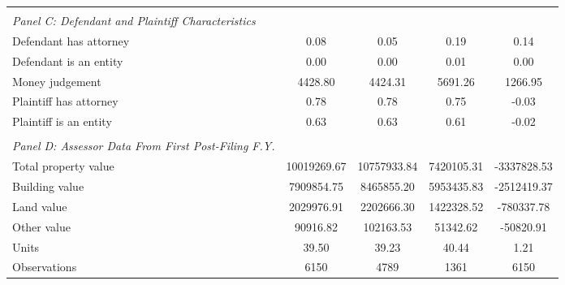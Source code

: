\begin{table}[htbp]
\begin{tabular}{l*{4}{c}}
\vspace{0.1em} \\ \emph{Panel C: Defendant and Plaintiff Characteristics}&            &            &            &            \\
\hspace{0.25cm}Defendant has attorney&       0.08 &       0.05 &       0.19 &        0.14\\
\hspace{0.25cm}Defendant is an entity&       0.00 &       0.00 &       0.01 &        0.00\\
\hspace{0.25cm}Money judgement&    4428.80 &    4424.31 &    5691.26 &     1266.95\\
\hspace{0.25cm}Plaintiff has attorney&       0.78 &       0.78 &       0.75 &       -0.03\\
\hspace{0.25cm}Plaintiff is an entity&       0.63 &       0.63 &       0.61 &       -0.02\\
\vspace{0.1em} \\ \emph{Panel D: Assessor Data From First Post-Filing F.Y.}&            &            &            &            \\
\hspace{0.25cm}Total property value&10019269.67 &10757933.84 & 7420105.31 & -3337828.53\\
\hspace{0.25cm}Building value& 7909854.75 & 8465855.20 & 5953435.83 & -2512419.37\\
\hspace{0.25cm}Land value& 2029976.91 & 2202666.30 & 1422328.52 &  -780337.78\\
\hspace{0.25cm}Other value&   90916.82 &  102163.53 &   51342.62 &   -50820.91\\
\hspace{0.25cm}Units&      39.50 &      39.23 &      40.44 &        1.21\\
\midrule
Observations        &        6150&        4789&        1361&        6150\\
\bottomrule
\end{tabular}
\end{table}
